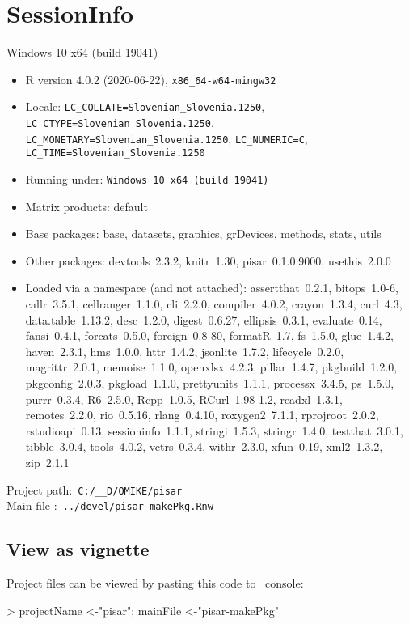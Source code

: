 \documentclass[a4paper,12pt]{article}\usepackage[]{graphicx}\usepackage[]{color}
\begin{document}
\section*{SessionInfo}
{\small
Windows 10 x64 (build 19041) 
\begin{itemize}\raggedright
  \item R version 4.0.2 (2020-06-22), \verb|x86_64-w64-mingw32|
  \item Locale: \verb|LC_COLLATE=Slovenian_Slovenia.1250|, \verb|LC_CTYPE=Slovenian_Slovenia.1250|, \verb|LC_MONETARY=Slovenian_Slovenia.1250|, \verb|LC_NUMERIC=C|, \verb|LC_TIME=Slovenian_Slovenia.1250|
  \item Running under: \verb|Windows 10 x64 (build 19041)|
  \item Matrix products: default
  \item Base packages: base, datasets, graphics, grDevices,
    methods, stats, utils
  \item Other packages: devtools~2.3.2, knitr~1.30,
    pisar~0.1.0.9000, usethis~2.0.0
  \item Loaded via a namespace (and not attached):
    assertthat~0.2.1, bitops~1.0-6, callr~3.5.1,
    cellranger~1.1.0, cli~2.2.0, compiler~4.0.2, crayon~1.3.4,
    curl~4.3, data.table~1.13.2, desc~1.2.0, digest~0.6.27,
    ellipsis~0.3.1, evaluate~0.14, fansi~0.4.1, forcats~0.5.0,
    foreign~0.8-80, formatR~1.7, fs~1.5.0, glue~1.4.2,
    haven~2.3.1, hms~1.0.0, httr~1.4.2, jsonlite~1.7.2,
    lifecycle~0.2.0, magrittr~2.0.1, memoise~1.1.0,
    openxlsx~4.2.3, pillar~1.4.7, pkgbuild~1.2.0,
    pkgconfig~2.0.3, pkgload~1.1.0, prettyunits~1.1.1,
    processx~3.4.5, ps~1.5.0, purrr~0.3.4, R6~2.5.0,
    Rcpp~1.0.5, RCurl~1.98-1.2, readxl~1.3.1, remotes~2.2.0,
    rio~0.5.16, rlang~0.4.10, roxygen2~7.1.1, rprojroot~2.0.2,
    rstudioapi~0.13, sessioninfo~1.1.1, stringi~1.5.3,
    stringr~1.4.0, testthat~3.0.1, tibble~3.0.4, tools~4.0.2,
    vctrs~0.3.4, withr~2.3.0, xfun~0.19, xml2~1.3.2, zip~2.1.1
\end{itemize}
Project path:\verb' C:/__D/OMIKE/pisar '\\
Main file :\verb' ../devel/pisar-makePkg.Rnw '


\subsection*{View as vignette}
Project files can be viewed by pasting this code to \R\ console:\\
\begin{Schunk}
\begin{Sinput}
> projectName <-"pisar";  mainFile <-"pisar-makePkg"


\end{Sinput}
\end{Schunk}}
\end{document}
